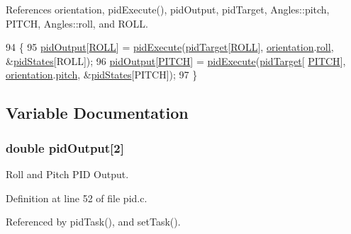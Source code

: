 References orientation, pid\-Execute(), pid\-Output, pid\-Target, Angles\-::pitch, P\-I\-T\-C\-H, Angles\-::roll, and R\-O\-L\-L.


\begin{DoxyCode}
94                    \{
95     \hyperlink{group__pid_ga5b70790e470e0c5812d24a8a098c01e0}{pidOutput}[\hyperlink{group__pid_gaf902416f65138704a180dbae2dc9d8f2}{ROLL}] = \hyperlink{group__pid_gaa373eb9da73ef4da4195fd5114555772}{pidExecute}(\hyperlink{group__pid_ga260bc1ef7a231f2252e6e69e1e459ba6}{pidTarget}[\hyperlink{group__pid_gaf902416f65138704a180dbae2dc9d8f2}{ROLL}], 
      \hyperlink{group__orientation_gacd4a2942520b68691db5aebde4e537a4}{orientation}.\hyperlink{struct_angles_a1d3228afa3a1d6773954f40c1e519eb9}{roll}, &\hyperlink{group__pid_ga9ce36f9a8e0e12e30b448e0161e3e5ec}{pidStates}[ROLL]);
96     \hyperlink{group__pid_ga5b70790e470e0c5812d24a8a098c01e0}{pidOutput}[\hyperlink{group__pid_gacd633835a520a62245ec6cfeb6d00e97}{PITCH}] = \hyperlink{group__pid_gaa373eb9da73ef4da4195fd5114555772}{pidExecute}(\hyperlink{group__pid_ga260bc1ef7a231f2252e6e69e1e459ba6}{pidTarget}[
      \hyperlink{group__pid_gacd633835a520a62245ec6cfeb6d00e97}{PITCH}], \hyperlink{group__orientation_gacd4a2942520b68691db5aebde4e537a4}{orientation}.\hyperlink{struct_angles_a34c057a0378030db67bd6a129f37d938}{pitch}, &\hyperlink{group__pid_ga9ce36f9a8e0e12e30b448e0161e3e5ec}{pidStates}[PITCH]);
97 \}
\end{DoxyCode}


\subsection{Variable Documentation}
\hypertarget{group__pid_ga5b70790e470e0c5812d24a8a098c01e0}{
\subsubsection[{pid\-Output}]{\setlength{\rightskip}{0pt plus 5cm}double pid\-Output\mbox{[}2\mbox{]}}}\label{group__pid_ga5b70790e470e0c5812d24a8a098c01e0}


Roll and Pitch P\-I\-D Output. 



Definition at line 52 of file pid.\-c.



Referenced by pid\-Task(), and set\-Task().


